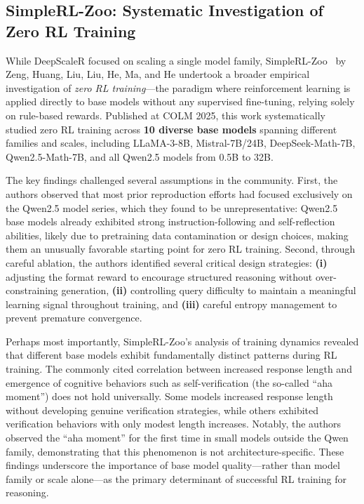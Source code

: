 \subsection*{SimpleRL-Zoo: Systematic Investigation of Zero RL Training}

While DeepScaleR focused on scaling a single model family, SimpleRL-Zoo~\cite{zeng2025simplerl} by Zeng, Huang, Liu, Liu, He, Ma, and He undertook a broader empirical investigation of \emph{zero RL training}---the paradigm where reinforcement learning is applied directly to base models without any supervised fine-tuning, relying solely on rule-based rewards. Published at COLM 2025, this work systematically studied zero RL training across \textbf{10 diverse base models} spanning different families and scales, including LLaMA-3-8B, Mistral-7B/24B, DeepSeek-Math-7B, Qwen2.5-Math-7B, and all Qwen2.5 models from 0.5B to 32B.

The key findings challenged several assumptions in the community. First, the authors observed that most prior reproduction efforts had focused exclusively on the Qwen2.5 model series, which they found to be unrepresentative: Qwen2.5 base models already exhibited strong instruction-following and self-reflection abilities, likely due to pretraining data contamination or design choices, making them an unusually favorable starting point for zero RL training. Second, through careful ablation, the authors identified several critical design strategies: \textbf{(i)} adjusting the format reward to encourage structured reasoning without over-constraining generation, \textbf{(ii)} controlling query difficulty to maintain a meaningful learning signal throughout training, and \textbf{(iii)} careful entropy management to prevent premature convergence.

Perhaps most importantly, SimpleRL-Zoo's analysis of training dynamics revealed that different base models exhibit fundamentally distinct patterns during RL training. The commonly cited correlation between increased response length and emergence of cognitive behaviors such as self-verification (the so-called ``aha moment'') does not hold universally. Some models increased response length without developing genuine verification strategies, while others exhibited verification behaviors with only modest length increases. Notably, the authors observed the ``aha moment'' for the first time in small models outside the Qwen family, demonstrating that this phenomenon is not architecture-specific. These findings underscore the importance of base model quality---rather than model family or scale alone---as the primary determinant of successful RL training for reasoning.

